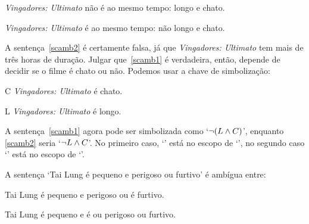 \begin{earg}
	\item[\ex{scamb1}] \emph{Vingadores: Ultimato} não é ao mesmo tempo: longo e chato.
	\item[\ex{scamb2}] \emph{Vingadores: Ultimato} é ao mesmo tempo: não longo e chato.
\end{earg}

A sentença~\ref{scamb2} é certamente falsa, já que \emph{Vingadores: Ultimato} tem mais de três horas de duração. Julgar que~\ref{scamb1} é verdadeira, então, depende de decidir se o filme é chato ou não. Podemos usar a chave de simbolização: 

\begin{ekey}
	\item[C] \emph{Vingadores: Ultimato} é chato.
	\item[L] \emph{Vingadores: Ultimato} é longo.
\end{ekey}

A sentença~\ref{scamb1} agora pode ser simbolizada como `$\neg(L \wedge C)$', enquanto \ref{scamb2} seria `$\neg L \wedge C$'. No primeiro caso, `\eand' está no escopo de `\enot', no segundo caso `\enot' está no escopo de `\eand'. 

A sentença `Tai Lung é pequeno e perigoso ou furtivo' é ambígua entre: 

\begin{earg}
	\item[\ex{scamb3}] Tai Lung é pequeno e perigoso ou é furtivo.
	\item[\ex{scamb4}] Tai Lung é pequeno e é ou perigoso ou furtivo.
\end{earg} 


